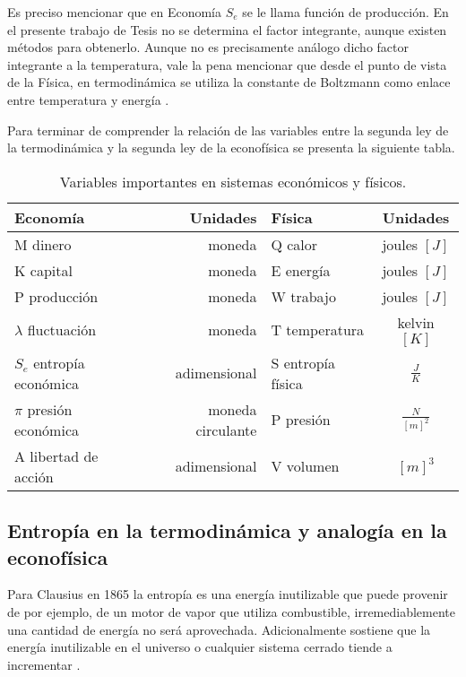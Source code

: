 Es preciso mencionar que en Economía $S_e$ se le llama función de producción. En el presente trabajo de Tesis no se determina el factor integrante, aunque existen métodos para obtenerlo. Aunque no es precisamente análogo dicho factor integrante a la temperatura, vale la pena mencionar que desde el punto de vista de la Física, en termodinámica se utiliza la constante de Boltzmann como enlace entre temperatura y energía \citep[][pagina 166]{richmond}. 

Para terminar de comprender la relación de las variables entre la segunda ley de la termodinámica y la segunda ley de la econofísica se presenta la siguiente tabla. 

\begin{table}	
	\begin{center}
		\begin{tabular}{ |l |r | l | c| }
			\hline
			Economía &  Unidades & Física & Unidades  \\ \hline
			M dinero & moneda & Q calor & joules $[J]$ \\
			K capital & moneda  & E energía & joules $[J]$\\ 
			P producción &  moneda   & W trabajo & joules $[J]$ \\
			$\lambda$ fluctuación & moneda & T temperatura & kelvin $[K]$\\ 
			$S_e$ entropía económica & adimensional & S entropía física & $\frac{J}{K}$ \\
			$\pi$ presión económica & moneda circulante & P presión & $\frac{N}{[m]^{2}}$\\
			A libertad de acción & adimensional & V volumen & $[m]^{3}$ \\
			\hline
		\end{tabular}
		\label{tab_analogiasFisEcono}
		\caption{Variables importantes en sistemas económicos y físicos.}
	\end{center}
\end{table}

\subsection{Entropía en la termodinámica y analogía en la econof\'isica} 

Para Clausius en 1865 la entropía es una energía inutilizable que puede provenir de por ejemplo, de un motor de vapor que utiliza combustible, irremediablemente una cantidad de energía no será aprovechada. Adicionalmente sostiene que la energía inutilizable en el universo o cualquier sistema cerrado tiende a incrementar \citep[][pagina 21]{cottrell_classical_2009}. 

